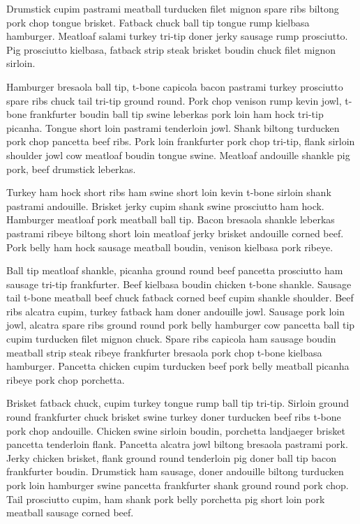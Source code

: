Drumstick cupim pastrami meatball turducken filet mignon spare ribs biltong pork chop tongue brisket. Fatback chuck ball tip tongue rump kielbasa hamburger. Meatloaf salami turkey tri-tip doner jerky sausage rump prosciutto. Pig prosciutto kielbasa, fatback strip steak brisket boudin chuck filet mignon sirloin.

Hamburger bresaola ball tip, t-bone capicola bacon pastrami turkey prosciutto spare ribs chuck tail tri-tip ground round. Pork chop venison rump kevin jowl, t-bone frankfurter boudin ball tip swine leberkas pork loin ham hock tri-tip picanha. Tongue short loin pastrami tenderloin jowl. Shank biltong turducken pork chop pancetta beef ribs. Pork loin frankfurter pork chop tri-tip, flank sirloin shoulder jowl cow meatloaf boudin tongue swine. Meatloaf andouille shankle pig pork, beef drumstick leberkas.

Turkey ham hock short ribs ham swine short loin kevin t-bone sirloin shank pastrami andouille. Brisket jerky cupim shank swine prosciutto ham hock. Hamburger meatloaf pork meatball ball tip. Bacon bresaola shankle leberkas pastrami ribeye biltong short loin meatloaf jerky brisket andouille corned beef. Pork belly ham hock sausage meatball boudin, venison kielbasa pork ribeye.

Ball tip meatloaf shankle, picanha ground round beef pancetta prosciutto ham sausage tri-tip frankfurter. Beef kielbasa boudin chicken t-bone shankle. Sausage tail t-bone meatball beef chuck fatback corned beef cupim shankle shoulder. Beef ribs alcatra cupim, turkey fatback ham doner andouille jowl. Sausage pork loin jowl, alcatra spare ribs ground round pork belly hamburger cow pancetta ball tip cupim turducken filet mignon chuck. Spare ribs capicola ham sausage boudin meatball strip steak ribeye frankfurter bresaola pork chop t-bone kielbasa hamburger. Pancetta chicken cupim turducken beef pork belly meatball picanha ribeye pork chop porchetta.

Brisket fatback chuck, cupim turkey tongue rump ball tip tri-tip. Sirloin ground round frankfurter chuck brisket swine turkey doner turducken beef ribs t-bone pork chop andouille. Chicken swine sirloin boudin, porchetta landjaeger brisket pancetta tenderloin flank. Pancetta alcatra jowl biltong bresaola pastrami pork. Jerky chicken brisket, flank ground round tenderloin pig doner ball tip bacon frankfurter boudin. Drumstick ham sausage, doner andouille biltong turducken pork loin hamburger swine pancetta frankfurter shank ground round pork chop. Tail prosciutto cupim, ham shank pork belly porchetta pig short loin pork meatball sausage corned beef.
